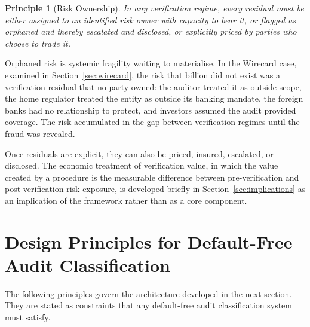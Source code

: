 \documentclass[11pt,a4paper]{article}
\newtheorem{principle}{Principle}[section]
\theoremstyle{definition}
\theoremstyle{remark}
\begin{document}
\begin{principle}[Risk Ownership]
\label{prin:ownership}
In any verification regime, every residual must be either assigned to an identified risk owner with capacity to bear it, or flagged as orphaned and thereby escalated and disclosed, or explicitly priced by parties who choose to trade it.
\end{principle}

Orphaned risk is systemic fragility waiting to materialise. In the Wirecard case, examined in Section~\ref{sec:wirecard}, the risk that  billion did not exist was a verification residual that no party owned: the auditor treated it as outside scope, the home regulator treated the entity as outside its banking mandate, the foreign banks had no relationship to protect, and investors assumed the audit provided coverage. The risk accumulated in the gap between verification regimes until the fraud was revealed.

Once residuals are explicit, they can also be priced, insured, escalated, or disclosed. The economic treatment of verification value, in which the value created by a procedure is the measurable difference between pre-verification and post-verification risk exposure, is developed briefly in Section~\ref{sec:implications} as an implication of the framework rather than as a core component.

\section{Design Principles for Default-Free Audit Classification}
\label{sec:principles}

The following principles govern the architecture developed in the next section. They are stated as constraints that any default-free audit classification system must satisfy.
\end{document}
